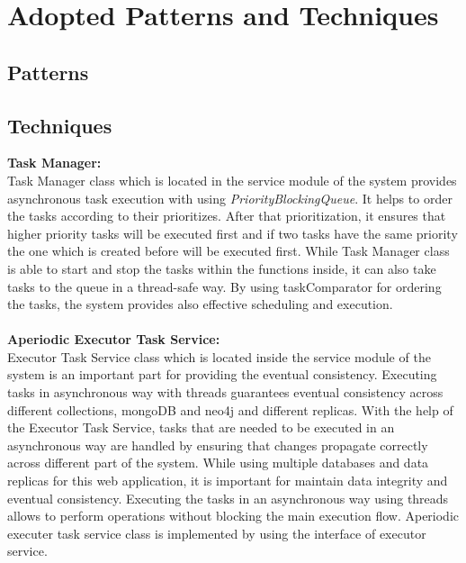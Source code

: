 

\section{Adopted Patterns and Techniques}
\subsection*{Patterns}


\subsection*{Techniques}

\textbf{Task Manager:}\\
Task Manager class which is located in the service module of the system provides asynchronous task execution with using 
\textit{PriorityBlockingQueue}. It helps to order the tasks according to their prioritizes. 
After that prioritization, it ensures that higher priority tasks will be executed first and if two tasks have the 
same priority the one which is created before will be executed first. While Task Manager class is able to start and stop the tasks within the functions inside,
it can also take tasks to the queue in a thread-safe way. By using taskComparator for ordering the tasks,
the system provides also effective scheduling and execution. \\ \\
\textbf{Aperiodic Executor Task Service:}\\
Executor Task Service class which is located inside the service module of the system is an important part for providing the eventual consistency. Executing tasks in asynchronous way with threads guarantees
eventual consistency across different collections, mongoDB and neo4j and different replicas. 
With the help of the Executor Task Service, tasks that are needed to be executed in an asynchronous way are handled by ensuring that changes propagate correctly across different part of the system.
While using multiple databases and data replicas for this web application, it is important for maintain data integrity and eventual consistency.
Executing the tasks in an asynchronous way using threads allows to perform operations without blocking the main execution flow.
Aperiodic executer task service class is implemented by using the interface of executor service. 


